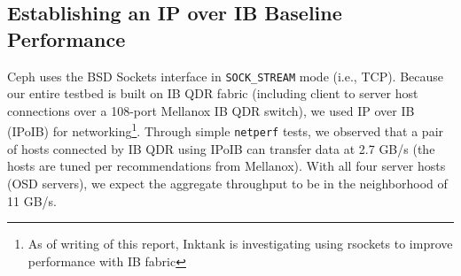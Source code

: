 \subsection{Establishing an IP over IB Baseline Performance}

Ceph uses the BSD Sockets interface in \texttt{SOCK\_STREAM} mode (i.e., TCP).
Because our entire testbed is built on IB QDR fabric (including client to
server host connections over a 108-port Mellanox IB QDR switch), we used IP
over IB (IPoIB) for networking\footnote{As of writing of this report, Inktank
is investigating using rsockets to improve performance with IB fabric}. Through
simple \verb!netperf! tests, we observed that a pair of hosts connected by IB
QDR using IPoIB can transfer data at 2.7 GB/s (the hosts are tuned per
recommendations from Mellanox). With all four server hosts (OSD servers), we
expect the aggregate throughput to be in the neighborhood of 11 GB/s.


